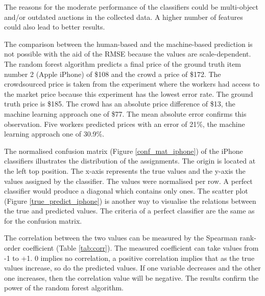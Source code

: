 The reasons for the moderate performance of the classifiers could be multi-object and/or outdated auctions in the collected data. A higher number of features could also lead to better results.

The comparison between the human-based and the machine-based prediction is not possible with the aid of the RMSE because the values are scale-dependent. The random forest algorithm predicts a final price of the ground truth item number 2 (Apple iPhone) of \$108 and the crowd a price of \$172. The crowdsourced price is taken from the experiment where the workers had access to the market price because this experiment has the lowest error rate. The ground truth price is \$185. The crowd has an absolute price difference of \$13, the machine learning approach one of \$77. The mean absolute error confirms this observation. Five workers predicted prices with an error of 21\%, the machine learning approach one of 30.9\%.

The normalised confusion matrix (Figure \ref{conf_mat_iphone}) of the iPhone classifiers illustrates the distribution of the assignments. The origin is located at the left top position. The x-axis represents the true values and the y-axis the values assigned by the classifier. The values were normalised per row. A perfect classifier would produce a diagonal which contains only ones. 
The scatter plot (Figure \ref{true_predict_iphone}) is another way to visualise the relations between the true and predicted values. The criteria of a perfect classifier are the same as for the confusion matrix.

The correlation between the two values can be measured by the Spearman rank-order coefficient (Table \ref{tab:corr}). The measured coefficient can take values from -1 to +1. 0 implies no correlation, a positive correlation implies that as the true values increase, so do the predicted values. If one variable decreases and the other one increases, then the correlation value will be negative. The results confirm the power of the random forest algorithm.


